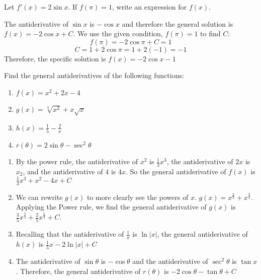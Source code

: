 \begin{Exercise}[label=antideriv2]
	Let $f'(x) = 2\sin{x}$. If $f(\pi) = 1$, write an expression for 
	$f(x)$. 
\end{Exercise}

\begin{Answer}[ref=antideriv2]
	The antiderivative of $\sin{x}$ is $-\cos{x}$ and therefore the 
	general solution is $f(x) = -2\cos{x} + C$. We use the given 
	condition, $f(\pi) = 1$ to find $C$:
	$$f(\pi) = -2\cos{\pi} + C = 1$$
	$$C = 1 + 2\cos{\pi} = 1 + 2(-1) = -1$$
	Therefore, the specific solution is $f(x) = -2\cos{x} - 1$
\end{Answer}

\begin{Exercise}[label=antideriv3]
	Find the general antiderivatives of the following functions:
	\begin{enumerate}
	\item $f(x) = x^2 + 2x - 4$
	\item $g(x) = \sqrt[3]{x^2} + x\sqrt{x}$
	\item $h(x) = \frac{1}{5} - \frac{2}{x}$
	\item $r(\theta) = 2\sin{\theta} - \sec^2{\theta}$
	\end{enumerate} 	
\end{Exercise}

\begin{Answer}[ref=antideriv3]
	\begin{enumerate}
	\item By the power rule, the antiderivative of $x^2$ is 
	$\frac{1}{3}x^3$, the antiderivative of $2x$ is $x_2$, and the 
	antiderivative of $4$ is $4x$. So the general antiderivative of $f(x)$ 
	is $\frac{1}{3}x^3 + x^2 - 4x + C$
	\item We can rewrite $g(x)$ to more clearly see the powers of $x$. 
	$g(x) = x^{\frac{2}{3}} + x^{\frac{3}{2}}$. Applying the Power rule, 
	we find the general antiderivative of $g(x)$ is 
	$\frac{3}{5}x^{\frac{5}{3}} + \frac{2}{5}x^{\frac{5}{2}} + C$. 
	\item Recalling that the antiderivative of $\frac{1}{x}$ is 
	$\ln{|x|}$, the general antiderivative of $h(x)$ is $\frac{1}{5}x - 
	2\ln{|x|} + C$
	\item The antiderivative of $\sin{\theta}$ is $-\cos{\theta}$ and the 
	antiderivative of $\sec^2{\theta}$ is $\tan{x}$. Therefore, the 
	general antiderivative of $r(\theta)$ is $-2\cos{\theta} - 
	\tan{\theta} + C$
	\end{enumerate}
\end{Answer}

